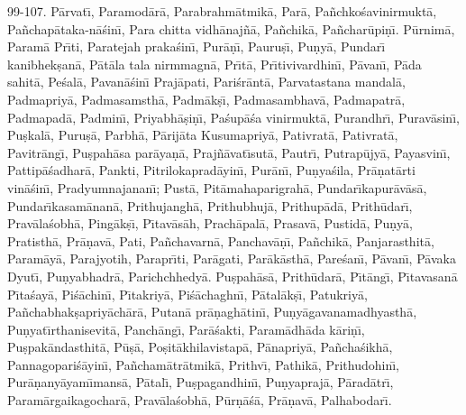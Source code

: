 99-107. P\=arvat\={\i}, Paramod\=ar\=a, Parabrahm\=atmik\=a, Par\=a, Pa\~nchko\'savinirmukt\=a, Pa\~nchap\=ataka-n\=a\'sin\={\i}, Para chitta vidh\=anaj\~n\=a, Pa\~nchik\=a, Pa\~nchar\=upi\d{n}\={\i}. P\=urnim\=a, Param\=a Pr\={\i}ti, Paratejah praka\'sin\={\i}, Pur\=a\d{n}\={\i}, Pauru\d{s}\={\i}, Pu\d{n}y\=a, Pundar\={\i} kanibhek\d{s}an\=a, P\=at\=ala tala nirmmagn\=a, Pr\={\i}t\=a, Pr\={\i}tivivardhin\={\i}, P\=avan\={\i}, P\=ada sahit\=a, Pe\'sal\=a, Pavan\=a\'sin\={\i} Praj\=apati, Pari\'sr\=ant\=a, Parvatastana mandal\=a, Padmapriy\=a, Padmasamsth\=a, Padm\=ak\d{s}\={\i}, Padmasambhav\=a, Padmapatr\=a, Padmapad\=a, Padmin\={\i}, Priyabh\=a\d{s}i\d{n}\={\i}, Pa\'sup\=a\'sa vinirmukt\=a, Purandhr\={\i}, Purav\=asin\={\i}, Pu\d{s}kal\=a, Puru\d{s}\=a, Parbh\=a, P\=arij\=ata Kusumapriy\=a, Pativrat\=a, Pativrat\=a, Pavitr\=ang\={\i}, Pu\d{s}pah\=asa par\=aya\d{n}\=a, Praj\~n\=avat\={\i}sut\=a, Pautr\={\i}, Putrap\=ujy\=a, Payasvin\={\i}, Pattip\=a\'sadhar\=a, Pankti, Pitrilokaprad\=ayin\={\i}, Pur\=an\={\i}, Pu\d{n}ya\'sila, Pr\=a\d{n}at\=arti vin\=a\'sin\={\i}, Pradyumnajanan\={\i}; Pust\=a, Pit\=amahaparigrah\=a, Pundar\={\i}kapur\=av\=as\=a, Pundar\={\i}kasam\=anan\=a, Prithujangh\=a, Prithubhuj\=a, Prithup\=ad\=a, Prith\=udar\={\i}, Prav\=ala\'sobh\=a, Ping\=ak\d{s}\={\i}, P\={\i}tav\=as\=ah, Prach\=apal\=a, Prasav\=a, Pustid\=a, Pu\d{n}y\=a, Pratisth\=a, Pr\=a\d{n}av\=a, Pati, Pa\~nchavarn\=a, Panchav\=a\d{n}\={\i}, Pa\~nchik\=a, Panjarasthit\=a, Param\=ay\=a, Parajyotih, Parapr\={\i}ti, Par\=agati, Par\=ak\=asth\=a, Pare\'san\={\i}, P\=avan\={\i}, P\=avaka Dyut\={\i}, Pu\d{n}yabhadr\=a, Parichchhedy\=a. Pu\d{s}pah\=as\=a, Prith\=udar\=a, P\={\i}t\=ang\={\i}, P\={\i}tavasan\=a P\={\i}ta\'say\=a, Pi\'s\=achin\={\i}, P\={\i}takriy\=a, Pi\'s\=achaghn\={\i}, P\=atal\=ak\d{s}\={\i}, Patukriy\=a, Pa\~nchabhak\d{s}apriy\=ach\=ar\=a, Putan\=a pr\=a\d{n}agh\=atin\={\i}, Pu\d{n}y\=agavanamadhyasth\=a, Pu\d{n}yat\={\i}rthanisevit\=a, Panch\=ang\={\i}, Par\=a\'sakti, Param\=adh\=ada k\=ari\d{n}\={\i}, Pu\d{s}pak\=andasthit\=a, P\=u\d{s}\=a, Po\d{s}it\=akhilavistap\=a, P\=anapriy\=a, Pa\~ncha\'sikh\=a, Pannagopari\'s\=ayin\={\i}, Pa\~ncham\=atr\=atmik\=a, Prithv\={\i}, Pathik\=a, Prithudohin\={\i}, Pur\=a\d{n}any\=ayam\={\i}mans\=a, P\=atal\={\i}, Pu\d{s}pagandhin\={\i}, Pu\d{n}yapraj\=a, P\=arad\=atr\={\i}, Param\=argaikagochar\=a, Prav\=ala\'sobh\=a, P\=ur\d{n}\=a\'s\=a, Pr\=a\d{n}av\=a, Palhabodar\={\i}.

